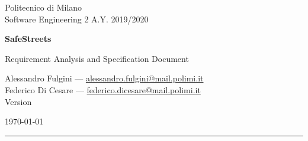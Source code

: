 
\parbox[t]{0.93\textwidth}{ %
			\parbox[t]{0.88\textwidth}{ %
        \sffamily
        {\Large{}\selectfont Politecnico di Milano\\}
        {\Large{}\selectfont Software Engineering 2 A\@.Y\@. 2019/2020\\}
				\vspace{70pt} %

        {\fontsize{50pt}{70pt}\bfseries\selectfont SafeStreets\\}

        \vspace{0.7cm}
        {\LARGE Requirement Analysis and Specification Document\\}
				\vspace{30pt} %
			}
		}

    \vfill %


  	\parbox[t]{0.93\textwidth}{ %
      \sffamily
  		\large %

      Alessandro Fulgini ---
      \href{mailto:alessandro.fulgini@mail.polimi.it}{alessandro.fulgini@mail.polimi.it}\\
      Federico Di Cesare ---
      \href{mailto:federico.dicesare@mail.polimi.it}{federico.dicesare@mail.polimi.it}\\

      {Version \Version}

  		\today

  		\rule{0.25\linewidth}{1pt}%
  	}